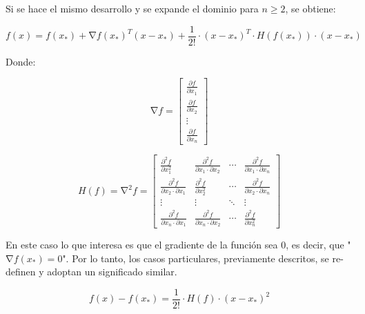 Si se hace el mismo desarrollo y se expande el dominio para $n\geq{2}$, se obtiene:

\begin{equation*}
	f\left(x\right)=f\left(x_{*}\right)+\mathrm{\nabla}{f}{\left(x_{*}\right)}^{T}\left(x-x_{*}\right)+\frac{1}{2!}\cdot{\left(x-x_{*}\right)}^{T}\cdot{H}\left({f}\left(x_{*}\right)\right) 		\cdot\left(x-x_{*}\right)
\end{equation*}

Donde:

\begin{equation*}
	\mathrm{\nabla}{f}= 	
	\begin{bmatrix}
		\frac{\partial{f}}{\partial{x}_1} \\
		\frac{\partial{f}}{\partial{x}_2}  \\
		\vdots \\
		\frac{\partial{f}}{\partial{x}_n}
	\end{bmatrix}
\end{equation*}

\begin{equation*}
	{H}\left(f\right)=\mathrm{\nabla}^{2}{f}= 	
	\begin{bmatrix}
		\frac{\partial^{2}{f}}{\partial{x}_{1}^{2}} & \frac{\partial^{2}{f}}{\partial{x}_{1}\cdot\partial{x}_{2}} & \cdots & \frac{\partial^{2}{f}}{\partial{x}_{1}\cdot\partial{x}_{n}}\\
		\frac{\partial^{2}{f}}{\partial{x}_{2}\cdot\partial{x}_{1}} & \frac{\partial^{2}{f}}{\partial{x}_{2}^{2}} & \cdots & \frac{\partial^{2}{f}}{\partial{x}_{2}\cdot\partial{x}_{n}}\\
		\vdots & \vdots & \ddots & \vdots\\
		\frac{\partial^{2}{f}}{\partial{x}_{n}\cdot\partial{x}_{1}} & \frac{\partial^{2}{f}}{\partial{x}_{n}\cdot\partial{x}_{2}} & \cdots & \frac{\partial^{2}{f}}{\partial{x}_{n}^{2}}
	\end{bmatrix}
\end{equation*}

En este caso lo que interesa es que el gradiente de la función sea 0, es decir, que "$\mathrm{\nabla}{f}{\left(x_{*}\right)}=0$". Por lo tanto, los casos particulares, previamente descritos, se re-definen y adoptan un significado similar. 

\begin{equation*}
	f\left(x\right)-f\left(x_{*}\right)=\frac{1}{2!}\cdot{H}\left(f\right)\cdot\left(x-x_{*}\right)^2 
\end{equation*}

